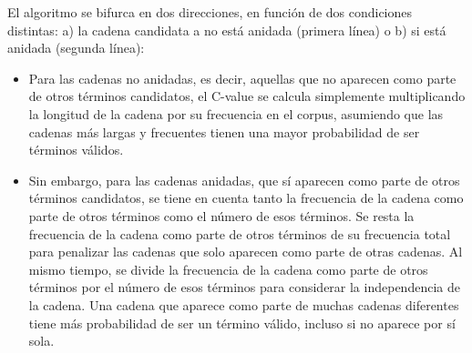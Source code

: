 \begin{itemize}
\label{eq:cvalue}



El algoritmo se bifurca en dos direcciones, en función de dos condiciones distintas: a) la cadena candidata a no está anidada (primera línea) o b) si está anidada (segunda línea):

\begin{itemize}
    \item Para las cadenas no anidadas, es decir, aquellas que no aparecen como parte de otros términos candidatos, el C-value se calcula simplemente multiplicando la longitud de la cadena por su frecuencia en el corpus, asumiendo que las cadenas más largas y frecuentes tienen una mayor probabilidad de ser términos válidos.
    \item Sin embargo, para las cadenas anidadas, que sí aparecen como parte de otros términos candidatos, se tiene en cuenta tanto la frecuencia de la cadena como parte de otros términos como el número de esos términos. Se resta la frecuencia de la cadena como parte de otros términos de su frecuencia total para penalizar las cadenas que solo aparecen como parte de otras cadenas. Al mismo tiempo, se divide la frecuencia de la cadena como parte de otros términos por el número de esos términos para considerar la independencia de la cadena. Una cadena que aparece como parte de muchas cadenas diferentes tiene más probabilidad de ser un término válido, incluso si no aparece por sí sola.
\end{itemize}


\end{itemize}
